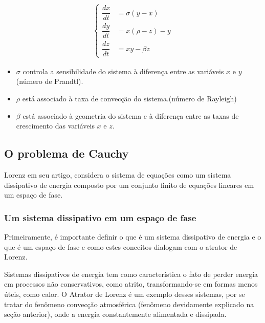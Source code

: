 \documentclass[12pt, a4paper]{article}
\begin{document}
    \begin{align*}
        \begin{cases}
            \dfrac{dx}{dt} & = \sigma(y-x)     \\
            \dfrac{dy}{dt} & = x(\rho - z) - y \\
            \dfrac{dz}{dt} & = xy - \beta z
        \end{cases}
    \end{align*}
    
    \begin{itemize}
        \item $\sigma$ controla a sensibilidade do sistema à diferença entre as
              variáveis $x$ e $y$ (número de Prandtl).
    
        \item $\rho$ está associado à taxa de convecção do sistema.(número de
              Rayleigh)
    
        \item $\beta$ está associado à geometria do sistema e à diferença entre
              as taxas de crescimento das variáveis $x$ e $z$.
    
    \end{itemize}
    
    \subsection{O problema de Cauchy}
    Lorenz em seu artigo, considera o sistema de equações como um sistema
    dissipativo de energia composto por um conjunto finito de equações lineares em
    um espaço de fase.
    
    \subsubsection{Um sistema dissipativo em um espaço de fase}
    
    Primeiramente, é importante definir o que é um sistema dissipativo de
    energia e o que é um espaço de fase e como estes conceitos dialogam com o
    atrator de Lorenz.
    
    Sistemas dissipativos de energia tem como característica o fato de perder
    energia em processos não conservativos, como atrito, transformando-se em formas
    menos úteis, como calor. O Atrator de Lorenz é um exemplo desses sistemas, por
    se tratar do fenômeno convecção atmosférica (fenômeno devidamente explicado na
    seção anterior), onde a energia constantemente alimentada e dissipada.
    
\end{document}
